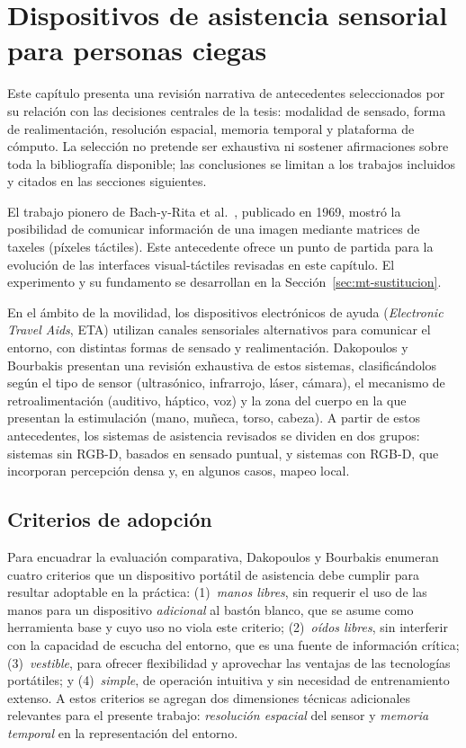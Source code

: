 
\section{Dispositivos de asistencia sensorial para personas ciegas}
\label{sec:ea-dispositivos}

Este capítulo presenta una revisión narrativa de antecedentes seleccionados por su relación con
las decisiones centrales de la tesis: modalidad de sensado, forma de realimentación, resolución
espacial, memoria temporal y plataforma de cómputo. La selección no pretende ser exhaustiva ni
sostener afirmaciones sobre toda la bibliografía disponible; las conclusiones se limitan a los
trabajos incluidos y citados en las secciones siguientes.

El trabajo pionero de Bach-y-Rita et al.\ \cite{BachyRita1969}, publicado en 1969, mostró la
posibilidad de comunicar información de una imagen mediante matrices de taxeles (píxeles táctiles).
Este antecedente ofrece un punto de partida para la evolución de las interfaces visual-táctiles
revisadas en este capítulo. El experimento y su fundamento se desarrollan en la
Sección~\ref{sec:mt-sustitucion}.

En el ámbito de la movilidad, los dispositivos electrónicos de ayuda
(\emph{Electronic Travel Aids}, ETA) utilizan canales sensoriales alternativos para comunicar
el entorno, con distintas formas de sensado y realimentación.
Dakopoulos y Bourbakis \cite{Dakopoulos2010} presentan una revisión exhaustiva de estos sistemas,
clasificándolos según el tipo de sensor (ultrasónico, infrarrojo, láser, cámara), el mecanismo de
retroalimentación (auditivo, háptico, voz) y la zona del cuerpo en la que presentan la estimulación
(mano, muñeca, torso, cabeza). A partir de estos antecedentes, los sistemas de asistencia revisados
se dividen en dos grupos: sistemas sin RGB-D, basados en sensado puntual, y sistemas con RGB-D, que
incorporan percepción densa y, en algunos casos, mapeo local.

\subsection{Criterios de adopción}
\label{subsec:ea-criterios}

Para encuadrar la evaluación comparativa, Dakopoulos y Bourbakis enumeran cuatro criterios que un
dispositivo portátil de asistencia debe cumplir para resultar adoptable en la práctica:
(1)~\emph{manos libres}, sin requerir el uso de las manos para un dispositivo \emph{adicional} al
bastón blanco, que se asume como herramienta base y cuyo uso no viola este criterio;
(2)~\emph{oídos libres}, sin interferir con la capacidad de escucha del entorno, que es una fuente
de información crítica; (3)~\emph{vestible}, para ofrecer flexibilidad y aprovechar las ventajas de
las tecnologías portátiles; y (4)~\emph{simple}, de operación intuitiva y sin necesidad de
entrenamiento extenso. A estos criterios se agregan dos dimensiones técnicas adicionales relevantes
para el presente trabajo: \emph{resolución espacial} del sensor y \emph{memoria temporal} en la
representación del entorno.

